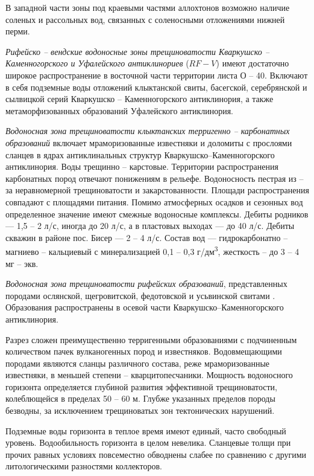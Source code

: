 В западной части зоны под краевыми частями аллохтонов возможно наличие соленых и рассольных вод, связанных с соленосными отложениями нижней перми.

\textit{Рифейско -- вендские водоносные зоны трещиноватости Кваркушско -- Каменногорского и Уфалейского антиклинориев} ($RF - V$) имеют достаточно
широкое распространение в восточной части территории листа О -- 40. Включают в себя подземные воды отложений клыктанской свиты, басегской, серебрянской и сылвицкой серий Кваркушско -- Каменногорского антиклинория, а также метаморфизованных образований Уфалейского антиклинория.

\textit{Водоносная зона трещиноватости клыктанских терригенно -- карбонатных образований}  включает мраморизованные известняки и доломиты с прослоями сланцев в ядрах антиклинальных структур Кваркушско--Каменногорского антиклинория. Воды трещинно -- карстовые. Территории распространения карбонатных пород отвечают понижениям в рельефе. Водоносность пестрая из -- за неравномерной трещиноватости и закарстованности.
Площади распространения совпадают с площадями питания. Помимо атмосферных осадков и сезонных вод определенное значение имеют смежные водоносные комплексы. Дебиты родников  ---  1,5 -- 2 л/с, иногда до 20 л/с, а в пластовых выходах  ---  до 40 л/с. Дебиты скважин в районе пос. Бисер  ---  2 -- 4 л/с.
Состав вод  ---  гидрокарбонатно -- магниево -- кальциевый с минерализацией 0,1 -- 0,3 г/дм\textsuperscript{3}, жесткость  --  до 3 -- 4 мг -- экв.

\textit{Водоносная зона трещиноватости рифейских образований}, представленных породами ослянской, щегровитской, федотовской и усьвинской свитами . Образования распространены в осевой части Кваркушско--Каменногорского антиклинория.

Разрез сложен преимущественно терригенными образованиями с подчиненным количеством пачек вулканогенных пород и известняков. Водовмещающими породами являются сланцы различного состава, реже мраморизованные известняки, в меньшей степени  --  кварцитопесчаники. Мощность водоносного горизонта определяется глубиной развития эффективной трещиноватости, колеблющейся в пределах 50 -- 60 м. Глубже указанных пределов
породы безводны, за исключением трещиноватых зон тектонических нарушений.

Подземные воды горизонта в теплое время имеют единый, часто свободный уровень. Водообильность горизонта в целом невелика. Сланцевые толщи
при прочих равных условиях повсеместно обводнены слабее по сравнению с другими литологическими разностями коллекторов.

